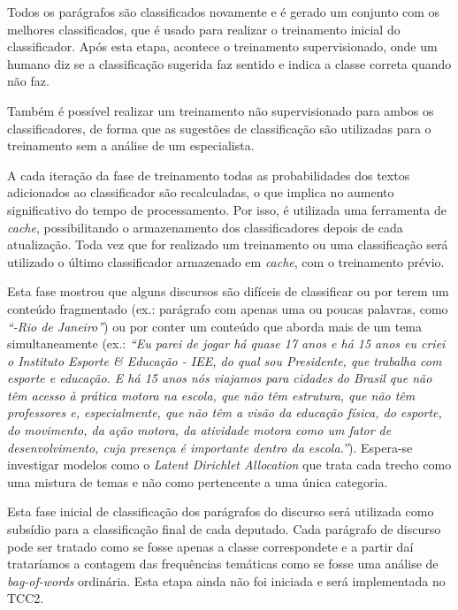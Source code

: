 Todos os parágrafos são classificados novamente e é gerado um conjunto com os melhores classificados, que é usado para realizar o treinamento inicial do classificador. Após esta etapa, acontece o treinamento supervisionado, onde um humano diz se a classificação sugerida faz sentido e indica a classe correta quando não faz.

Também é possível realizar um treinamento não supervisionado para ambos os classificadores, de forma que as sugestões de classificação são utilizadas para o treinamento sem a análise de um especialista.

A cada iteração da fase de treinamento todas as probabilidades dos textos adicionados ao classificador são recalculadas, o que implica no aumento significativo do tempo de processamento. Por isso, é utilizada uma ferramenta de \textit{cache}, possibilitando o armazenamento dos classificadores depois de cada atualização. Toda vez que for realizado um treinamento ou uma classificação será utilizado o último classificador armazenado em \textit{cache}, com o treinamento prévio.

Esta fase mostrou que alguns discursos são difíceis de classificar ou por terem um conteúdo fragmentado (ex.: parágrafo com apenas uma ou poucas palavras, como \textit{``-Rio de Janeiro''}) ou por conter um conteúdo que aborda mais de um tema simultaneamente (ex.: \textit{``Eu parei de jogar há quase 17 anos e há 15 anos eu criei o Instituto Esporte \& Educação - IEE, do qual sou Presidente, que trabalha com esporte e educação. E há 15 anos nós viajamos para cidades do Brasil que não têm acesso à prática motora na escola, que não têm estrutura, que não têm professores e, especialmente, que não têm a visão da educação física, do esporte, do movimento, da ação motora, da atividade motora como um fator de desenvolvimento, cuja presença é importante dentro da escola.''}). Espera-se investigar modelos como o \textit{Latent Dirichlet Allocation} que trata cada trecho como uma mistura de temas e não como pertencente a uma única categoria.

Esta fase inicial de classificação dos parágrafos do discurso será utilizada como subsídio para a classificação final de cada deputado. Cada parágrafo de discurso pode ser tratado como se fosse apenas a classe correspondete e a partir daí trataríamos a contagem das frequências temáticas como se fosse uma análise de \textit{bag-of-words} ordinária. Esta etapa ainda não foi iniciada e será implementada no TCC2.
